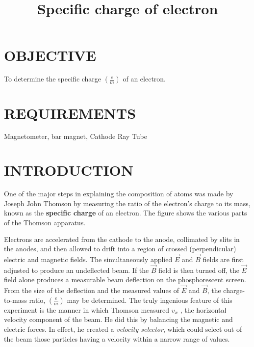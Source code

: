 \documentclass[12pt,a4paper]{article}
\title{Specific charge of electron}
\begin{document}
		\maketitle
		
		\section{OBJECTIVE}
		
			To determine the specific charge $\left(\frac{e}{m}\right)$ of an electron.
			
		\section{REQUIREMENTS}
			Magnetometer, bar magnet, Cathode Ray Tube
			
		\section{INTRODUCTION}
			One of the major steps in explaining the composition of atoms was made by Joseph John Thomson by measuring the ratio of the electron's charge to its mass, known as the \textbf{specific charge} of an electron. The figure shows the various parts of the Thomson apparatus.
			
			Electrons are accelerated from the cathode to the anode, collimated by slits in the anodes, and then allowed to drift into a region of crossed (perpendicular) electric and magnetic fields. The simultaneously applied $\vec{E}$ and $\vec{B}$ fields are first adjusted to produce an
			undeflected beam. If the $\vec{B}$ field is then turned off, the $\vec{E}$ field alone
			produces a measurable beam deflection on the phosphorescent screen.
			From the size of the deflection and the measured values of $\vec{E}$ and $\vec{B}$, the
			charge-to-mass ratio, $\left(\frac{e}{m}\right)$ may be determined. The truly ingenious feature
			of this experiment is the manner in which Thomson measured $v_x$ , the
			horizontal velocity component of the beam. He did this by balancing the
			magnetic and electric forces. In effect, he created a \textit{velocity selector}, which
			could select out of the beam those particles having a velocity within a
			narrow range of values.
			
			
			
\end{document}

